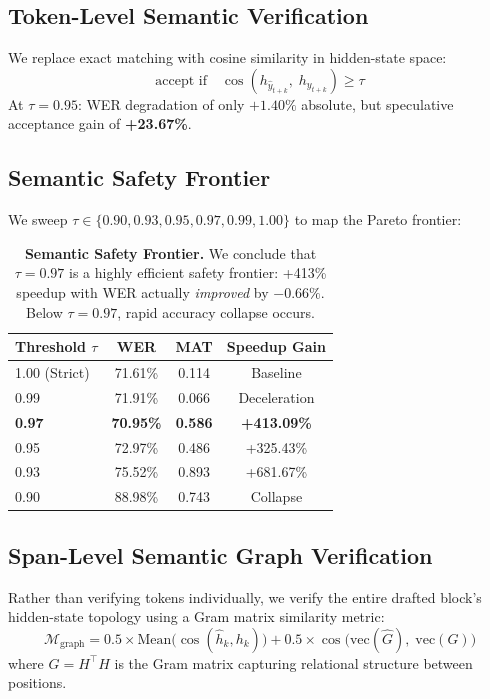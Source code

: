 \documentclass[11pt,a4paper]{article}
\begin{document}
\subsection{Token-Level Semantic Verification}
We replace exact matching with cosine similarity in hidden-state space:
\begin{equation}
    \text{accept if}\quad \cos(h_{\hat{y}_{t+k}},\; h_{y_{t+k}}) \geq \tau
\end{equation}
At $\tau = 0.95$: WER degradation of only $+1.40\%$ absolute, but speculative acceptance gain of \textbf{+23.67\%}.

\subsection{Semantic Safety Frontier}

We sweep $\tau \in \{0.90, 0.93, 0.95, 0.97, 0.99, 1.00\}$ to map the Pareto frontier:

\begin{table}[H]
\centering
\small
\begin{tabular}{@{}lccc@{}}
\toprule
\textbf{Threshold $\tau$} & \textbf{WER} & \textbf{MAT} & \textbf{Speedup Gain} \\
\midrule
1.00 (Strict) & 71.61\% & 0.114 & Baseline \\
0.99 & 71.91\% & 0.066 & Deceleration \\
\textbf{0.97} & \textbf{70.95\%} & \textbf{0.586} & \textbf{+413.09\%} \\
0.95 & 72.97\% & 0.486 & +325.43\% \\
0.93 & 75.52\% & 0.893 & +681.67\% \\
0.90 & 88.98\% & 0.743 & Collapse \\
\bottomrule
\end{tabular}
\caption{\textbf{Semantic Safety Frontier.}
We conclude that $\tau = 0.97$ is a highly efficient safety frontier: +413\% speedup with WER actually \emph{improved} by $-0.66\%$.
Below $\tau = 0.97$, rapid accuracy collapse occurs.}
\label{tab:frontier}
\end{table}

\subsection{Span-Level Semantic Graph Verification}

Rather than verifying tokens individually, we verify the entire drafted block's hidden-state topology using a Gram matrix similarity metric:
\begin{equation}
    \mathcal{M}_{\mathrm{graph}} = 0.5 \times \mathrm{Mean}\!\bigl(\cos(\hat{h}_k, h_k)\bigr) + 0.5 \times \cos\!\bigl(\mathrm{vec}(\hat{G}),\; \mathrm{vec}(G)\bigr)
\end{equation}
where $G = H^\top H$ is the Gram matrix capturing relational structure between positions.
\end{document}
